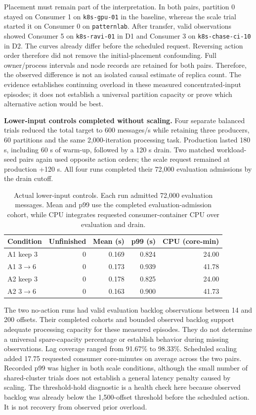Placement must remain part of the interpretation. In both pairs, partition 0 stayed on Consumer 1 on \texttt{k8s-gpu-01} in the baseline, whereas the scale trial started it on Consumer 0 on \texttt{patternlab}. After transfer, valid observations showed Consumer 5 on \texttt{k8s-ravi-01} in D1 and Consumer 3 on \texttt{k8s-chase-ci-10} in D2. The curves already differ before the scheduled request. Reversing action order therefore did not remove the initial-placement confounding. Full owner/process intervals and node records are retained for both pairs. Therefore, the observed difference is not an isolated causal estimate of replica count. The evidence establishes continuing overload in these measured concentrated-input episodes; it does not establish a universal partition capacity or prove which alternative action would be best.


\textbf{Lower-input controls completed without scaling.} Four separate balanced trials reduced the total target to 600 messages/s while retaining three producers, 60 partitions and the same 2,000-iteration processing task. Production lasted 180 s, including 60 s of warm-up, followed by a 120 s drain. Two matched workload-seed pairs again used opposite action orders; the scale request remained at production +120 s. All four runs completed their 72,000 evaluation admissions by the drain cutoff.

\begin{table}[!htbp]
\centering\small
\setlength{\tabcolsep}{5pt}
\begin{tabular}{@{}lrrrr@{}}
\toprule
\textbf{Condition} & \textbf{Unfinished} & \textbf{Mean (s)} & \textbf{p99 (s)} & \textbf{CPU (core-min)}\\
\midrule
A1 keep 3 & 0 & 0.169 & 0.824 & 24.00\\
A1 3$\to$6 & 0 & 0.173 & 0.939 & 41.78\\
A2 keep 3 & 0 & 0.178 & 0.825 & 24.00\\
A2 3$\to$6 & 0 & 0.163 & 0.900 & 41.73\\
\bottomrule
\end{tabular}
\caption{Actual lower-input controls. Each run admitted 72,000 evaluation messages. Mean and p99 use the completed evaluation-admission cohort, while CPU integrates requested consumer-container CPU over evaluation and drain.}
\label{tab:preliminary-low-input}
\end{table}

The two no-action runs had valid evaluation backlog observations between 14 and 200 offsets. Their completed cohorts and bounded observed backlog support adequate processing capacity for these measured episodes. They do not determine a universal spare-capacity percentage or establish behavior during missing observations. Lag coverage ranged from 91.67\% to 98.33\%. Scheduled scaling added 17.75 requested consumer core-minutes on average across the two pairs. Recorded p99 was higher in both scale conditions, although the small number of shared-cluster trials does not establish a general latency penalty caused by scaling. The threshold-hold diagnostic is a health check here because observed backlog was already below the 1,500-offset threshold before the scheduled action. It is not recovery from observed prior overload.

